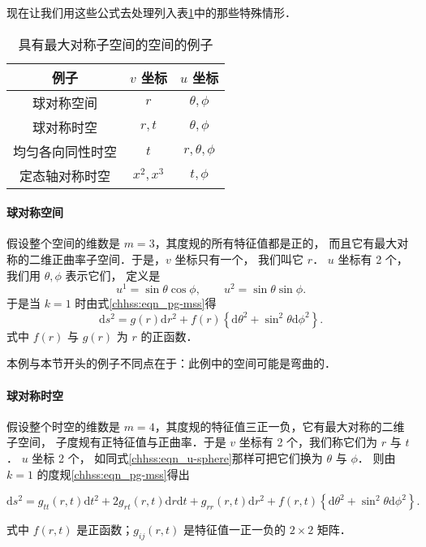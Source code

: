 现在让我们用这些公式去处理列入表\ref{chhss:tab-msss}中的那些特殊情形．

\begin{table}[htb]
    \centering
    \caption{具有最大对称子空间的空间的例子} \label{chhss:tab-msss}
    \begin{tabular}{c|c|c}
        \hline 例子 & $v$ 坐标 & $u$ 坐标 \\
        \hline 球对称空间 & $r$ & $\theta, \phi$ \\
        球对称时空 & $r, t$ & $\theta, \phi$ \\
        均匀各向同性时空 & $t$ & $r, \theta, \phi$ \\
        定态轴对称时空 & $x^2,x^3 $ & $t,\phi$ \\
        \hline
    \end{tabular}
\end{table}


\paragraph{球对称空间}
假设整个空间的维数是 $m=3$，其度规的所有特征值都是正的，
而且它有最大对称的二维正曲率子空间．于是，$v$ 坐标只有一个， 我们叫它 $r$．
$u$ 坐标有 2 个，我们用 $\theta, \phi$ 表示它们， 定义是
\begin{equation}\label{chhss:eqn_u-sphere}
    u^1=\sin \theta \cos \phi, \qquad u^2=\sin \theta \sin \phi .
\end{equation}
于是当 $k=1$ 时由式\eqref{chhss:eqn_pg-mss}得
\begin{equation}\label{chhss_eqn_g-sphere}
    \mathrm{d} s^2=g(r) \mathrm{d} r^2+f(r)\left\{\mathrm{d} \theta^2+\sin ^2 \theta \mathrm{d} \phi^2\right\} .
\end{equation}
式中 $f(r)$ 与 $g(r)$ 为 $r$ 的正函数．

本例与本节开头的例子不同点在于：此例中的空间可能是弯曲的．



\paragraph{球对称时空}
假设整个时空的维数是 $m=4$，其度规的特征值三正一负，它有最大对称的二维子空间，
子度规有正特征值与正曲率．于是 $v$ 坐标有 2 个，我们称它们为 $r$ 与 $t$．
$u$ 坐标 2 个， 如同式\eqref{chhss:eqn_u-sphere}那样可把它们换为 $\theta$ 与 $\phi$． 
则由 $k=1$ 的度规\eqref{chhss:eqn_pg-mss}得出
\begin{small}
\begin{equation}\label{chhss_eqn_g-st-sphere}
    \mathrm{d} s^2=  g_{t t}(r, t) \mathrm{d} t^2+2 g_{r t}(r, t) \mathrm{d} r \mathrm{d} t+g_{r r}(r, t) \mathrm{d} r^2 
     +f(r, t)\left\{\mathrm{d} \theta^2+\sin ^2 \theta \mathrm{d} \phi^2\right\} .
\end{equation}
\end{small}
式中 $f(r, t)$ 是正函数；$g_{i j}(r, t)$ 是特征值一正一负的 $2 \times 2$ 矩阵．

